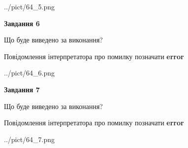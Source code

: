 \documentclass[10pt, ukrainian]{article}
\begin{document}
{\begin {large}
\begin{center}
	{../pict/64_5.png}
\end{center}
\newpage

{\begin {center}\textbf{Завдання 6}\end {center}}\par
Що буде виведено за виконання? \par
Повідомлення інтерпретатора про помилку позначати \textbf{error}

\begin{center}
	{../pict/64_6.png}
\end{center}
\newpage

{\begin {center}\textbf{Завдання 7}\end {center}}\par
Що буде виведено за виконання? \par
Повідомлення інтерпретатора про помилку позначати \textbf{error}

\begin{center}
	{../pict/64_7.png}
\end{center}
\newpage

\end {large}}
\end{document}
